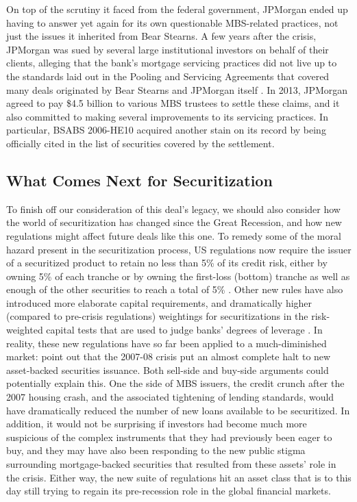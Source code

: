 \documentclass[12pt]{article}
\begin{document}
On top of the scrutiny it faced from the federal government, JPMorgan ended up having to answer yet again for its own questionable MBS-related practices, not just the issues it inherited from Bear Stearns. A few years after the crisis, JPMorgan was sued by several large institutional investors on behalf of their clients, alleging that the bank’s mortgage servicing practices did not live up to the standards laid out in the Pooling and Servicing Agreements that covered many deals originated by Bear Stearns and JPMorgan itself \parencite{gibbs13}. In 2013, JPMorgan agreed to pay \$4.5 billion to various MBS trustees to settle these claims, and it also committed to making several improvements to its servicing practices. In particular, BSABS 2006-HE10 acquired another stain on its record by being officially cited in the list of securities covered by the settlement.


\subsection*{What Comes Next for Securitization}

To finish off our consideration of this deal’s legacy, we should also consider how the world of securitization has changed since the Great Recession, and how new regulations might affect future deals like this one. To remedy some of the moral hazard present in the securitization process, US regulations now require the issuer of a securitized product to retain no less than 5\% of its credit risk, either by owning 5\% of each tranche or by owning the first-loss (bottom) tranche as well as enough of the other securities to reach a total of 5\% \parencite{scheicher17}. Other new rules have also introduced more elaborate capital requirements, and dramatically higher (compared to pre-crisis regulations) weightings for securitizations in the risk-weighted capital tests that are used to judge banks’ degrees of leverage \parencite{scheicher17}. In reality, these new regulations have so far been applied to a much-diminished market: \textcite{gorton12} point out that the 2007-08 crisis put an almost complete halt to new asset-backed securities issuance. Both sell-side and buy-side arguments could potentially explain this. One the side of MBS issuers, the credit crunch after the 2007 housing crash, and the associated tightening of lending standards, would have dramatically reduced the number of new loans available to be securitized. In addition, it would not be surprising if investors had become much more suspicious of the complex instruments that they had previously been eager to buy, and they may have also been responding to the new public stigma surrounding mortgage-backed securities that resulted from these assets’ role in the crisis. Either way, the new suite of regulations hit an asset class that is to this day still trying to regain its pre-recession role in the global financial markets.
\end{document}
